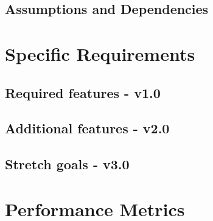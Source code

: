 \documentclass[onecolumn, draftclsnofoot,10pt, compsoc]{IEEEtran}
\begin{document}
		\subsection*{Assumptions and Dependencies}

	\section*{Specific Requirements}
		\subsection*{Required features - v1.0}

		\subsection*{Additional features - v2.0}

		\subsection*{Stretch goals - v3.0}

		\section*{Performance Metrics}
\end{document}
